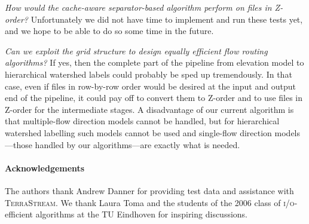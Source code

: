 \documentclass[10pt,a4paper]{article}
\def\io{\textsc{i/o}\xspace}
\def\tsm{\textsc{TerraStream}\xspace}
\begin{document}
\emph{How would the cache-aware separator-based algorithm perform on files in Z-order?}
Unfortunately we did not have time to implement and run these tests yet, and we hope to be able to do so some time in the future.

\emph{Can we exploit the grid structure to design equally efficient flow routing algorithms?}
If yes, then the complete part of the pipeline from elevation model to hierarchical watershed labels could probably be sped up tremendously. In that case, even if files in row-by-row order would be desired at the input and output end of the pipeline, it could pay off to convert them to Z-order and to use files in Z-order for the intermediate stages. A disadvantage of our current algorithm is that multiple-flow direction models cannot be handled, but for hierarchical watershed labelling such models cannot be used and single-flow direction models---those handled by our algorithms---are exactly what is needed.

\paragraph*{Acknowledgements}
The authors thank Andrew Danner for providing test data and assistance with \tsm.
We thank Laura Toma and the students of the 2006 class of \io-efficient algorithms
at the TU Eindhoven for inspiring discussions.

\small

\end{document}
